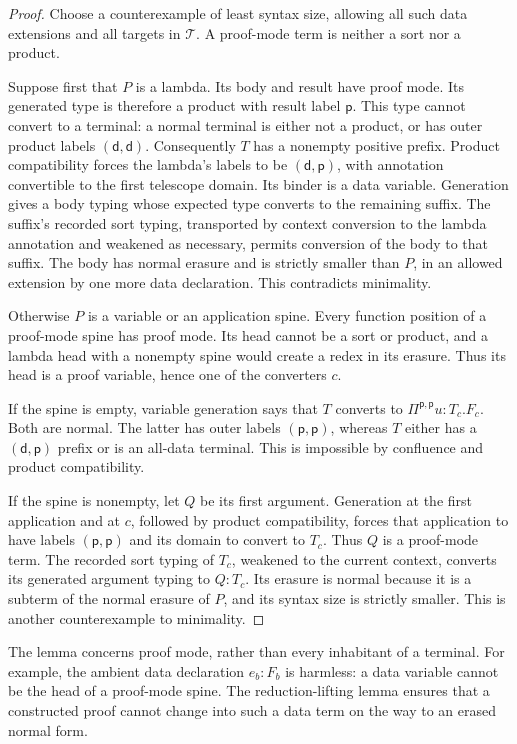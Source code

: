 \begin{proof}
Choose a counterexample of least syntax size, allowing all such data
extensions and all targets in $\mathcal T$.  A proof-mode term is neither
a sort nor a product.

Suppose first that $P$ is a lambda.  Its body and result have proof mode.
Its generated type is therefore a product with result label $\mathsf p$.
This type cannot convert to a terminal: a normal terminal is either not a
product, or has outer product labels $(\mathsf d,\mathsf d)$.
Consequently $T$ has a nonempty positive prefix.  Product compatibility
forces the lambda's labels to be $(\mathsf d,\mathsf p)$, with annotation
convertible to the first telescope domain.  Its binder is a data variable.
Generation gives a body typing whose expected type converts to the
remaining suffix.  The suffix's recorded sort typing, transported by
context conversion to the lambda annotation and weakened as necessary,
permits conversion of the body to that suffix.  The body has normal
erasure and is strictly smaller than $P$, in an allowed extension by one
more data declaration.  This contradicts minimality.

Otherwise $P$ is a variable or an application spine.  Every function position
of a proof-mode spine has proof mode.  Its head cannot be a sort or product,
and a lambda head with a nonempty spine would create a redex in its erasure.
Thus its head is a proof variable, hence one of the converters $c$.

If the spine is empty, variable generation says that $T$ converts to
$\Pi^{\mathsf p,\mathsf p}u:T_c.F_c$.  Both are normal.  The latter
has outer labels $(\mathsf p,\mathsf p)$, whereas $T$ either has a
$(\mathsf d,\mathsf p)$ prefix or is an all-data terminal.  This is
impossible by confluence and product compatibility.

If the spine is nonempty, let $Q$ be its first argument.  Generation at the
first application and at $c$, followed by product compatibility, forces
that application to have labels $(\mathsf p,\mathsf p)$ and its domain
to convert to $T_c$.  Thus $Q$ is a proof-mode term.  The recorded sort
typing of $T_c$, weakened to the current context, converts its generated
argument typing to $Q:T_c$.  Its erasure is normal because it is a subterm
of the normal erasure of $P$, and its syntax size is strictly smaller.
This is another counterexample to minimality.
\end{proof}

The lemma concerns proof mode, rather than every inhabitant of a terminal.
For example, the ambient data declaration $e_b:F_b$ is harmless: a data
variable cannot be the head of a proof-mode spine.  The reduction-lifting
lemma ensures that a constructed proof cannot change into such a data term
on the way to an erased normal form.

